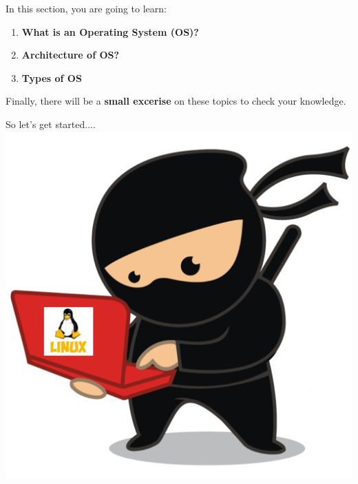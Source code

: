 
\setlength{\columnsep}{3pt}
\begin{flushleft}
	\bigskip
	\bigskip
	\begin{tcolorbox}[breakable,notitle,boxrule=1pt,colback=black,colframe=black]
	\color{white}
	\bigskip
	In this section, you are going to learn:
	\begin{enumerate}
		\item \textbf{What is an Operating System (OS)?}
		\item \textbf{Architecture of OS?}
		\item \textbf{Types of OS}
	\end{enumerate}	
	\bigskip
	Finally, there will be a \textbf{small excerise} on these topics to check your knowledge.
	\bigskip
	\end{tcolorbox}

	
	\bigskip
	\bigskip
	
	\begin{multicols}{2}
		\vspace*{\fill}
		\vspace*{\fill}
		\vspace*{\fill}
		\vspace*{\fill}
		\vspace*{\fill}
		\vspace*{\fill}
		\vspace*{\fill}
		\vspace*{\fill}
		\vspace*{\fill}
		
		\vfill \null
		\columnbreak
		So let's get started....
		\includegraphics[scale=0.08]{content/linux_section.png}
	\end{multicols}	
	
\end{flushleft}

\newpage





